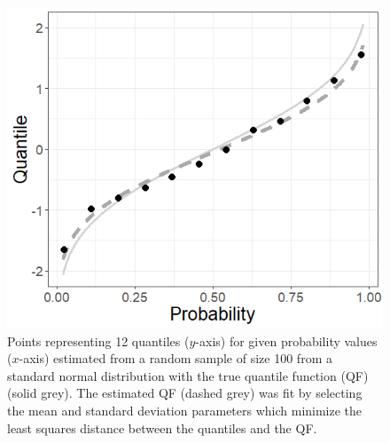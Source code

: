 \documentclass[preprint,12pt,authoryear]{elsarticle}
\newcommand{\1}[1]{\mathds{1}\left[#1\right]}
\begin{document}
\begin{figure}[hbt!]
    \centering
    \includegraphics[scale=.5]{Images/fit_quantiles_example.png}
    \caption{Points representing 12 quantiles ($y$-axis) for given probability 
    values ($x$-axis) estimated from a random sample of size 100 from a 
    standard normal distribution with the true quantile function (QF) 
    (solid grey). The estimated QF (dashed grey) was fit by selecting the mean 
    and standard deviation 
    parameters which minimize the least squares distance between the quantiles 
    and the QF.}
    \label{fig:quant_match_example}
\end{figure}
\end{document}
